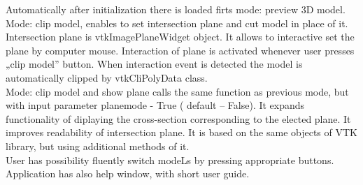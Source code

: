 \indent Automatically after initialization there is loaded firts mode: preview 3D model. 
Mode: clip model, enables to set intersection plane and cut model in place of it. Intersection plane is vtkImagePlaneWidget object. It allows to interactive set the plane by computer mouse. Interaction of plane is activated whenever user presses „clip model” button. When interaction event is detected the model is automatically clipped by vtkCliPolyData class. \\
\indent Mode:  clip model and show plane calls the same function as previous mode, but with input parameter planemode - True ( default – False). It expands functionality of diplaying the cross-section corresponding to the elected plane. It improves readability of intersection plane. It is based on the same objects of VTK library, but using additional methods of it.\\
\indent User has possibility fluently switch modeLs by pressing appropriate buttons. Application has also help window, with short user guide.
